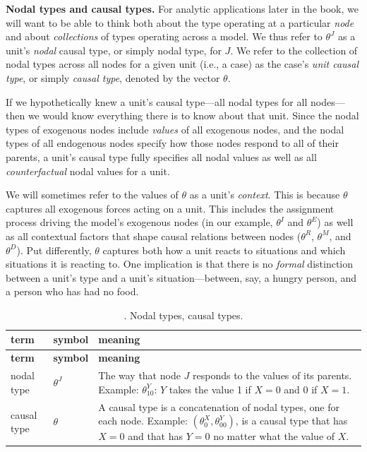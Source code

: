 \documentclass[
  12pt,
]{book}
\begin{document}
\textbf{Nodal types and causal types.} For analytic applications later in the book, we will want to be able to think both about the type operating at a particular \emph{node} and about \emph{collections} of types operating across a model. We thus refer to \(\theta^J\) as a unit's \emph{nodal} causal type, or simply nodal type, for \(J\). We refer to the collection of nodal types across all nodes for a given unit (i.e., a case) as the case's \emph{unit causal type}, or simply \emph{causal type}, denoted by the vector \(\theta\).

If we hypothetically knew a unit's causal type---all nodal types for all nodes---then we would know everything there is to know about that unit. Since the nodal types of exogenous nodes include \emph{values} of all exogenous nodes, and the nodal types of all endogenous nodes specify how those nodes respond to all of their parents, a unit's causal type fully specifies all nodal values as well as all \emph{counterfactual} nodal values for a unit.

We will sometimes refer to the values of \(\theta\) as a unit's \emph{context}. This is because \(\theta\) captures all exogenous forces acting on a unit. This includes the assignment process driving the model's exogenous nodes (in our example, \(\theta^I\) and \(\theta^E\)) as well as all contextual factors that shape causal relations between nodes (\(\theta^R\), \(\theta^M\), and \(\theta^D\)). Put differently, \(\theta\) captures both how a unit reacts to situations and which situations it is reacting to. One implication is that there is no \emph{formal} distinction between a unit's type and a unit's situation---between, say, a hungry person, and a person who has had no food.

\begin{longtable}[]{@{}
  >{\centering\arraybackslash}p{}
  >{\centering\arraybackslash}p{}
  >{\centering\arraybackslash}p{}@{}}
\caption{\label{tab:NTCT}. Nodal types, causal types.}\tabularnewline
\toprule
\textbf{term} & \textbf{symbol} & \textbf{meaning} \\
\midrule
\endfirsthead
\toprule
\textbf{term} & \textbf{symbol} & \textbf{meaning} \\
\midrule
\endhead
nodal type & \(\theta^J\) & The way that node \(J\) responds to the values of its parents. Example: \(\theta^Y_{10}\): \(Y\) takes the value 1 if \(X=0\) and 0 if \(X=1\). \\
causal type & \(\theta\) & A causal type is a concatenation of nodal types, one for each node. Example: \((\theta^X_0, \theta^Y_{00})\), is a causal type that has \(X=0\) and that has \(Y=0\) no matter what the value of \(X\). \\
\bottomrule
\end{longtable}
\end{document}
